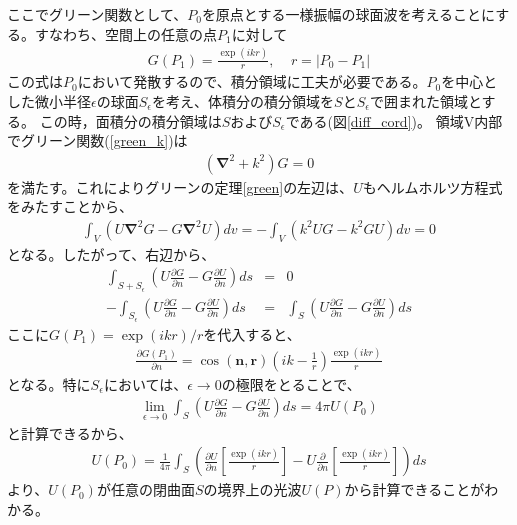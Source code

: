 \documentclass[a4paper,11pt,uplatex]{jsbook}
\begin{document}
ここでグリーン関数として、$P_0$を原点とする一様振幅の球面波を考えることにする。すなわち、空間上の任意の点$P_1$に対して
\begin{eqnarray}
  G(P_1) = \frac{\exp(ikr)}{r},~~~~~r = \left|P_0- P_1\right| \label{green_k}
\end{eqnarray}
この式は$P_0$において発散するので、積分領域に工夫が必要である。$P_0$を中心とした微小半径$\epsilon$の球面$S_\epsilon$を考え、体積分の積分領域を$S$と$S_\epsilon$で囲まれた領域とする。
この時，面積分の積分領域は$S$および$S_\epsilon$である(図\ref{diff_cord})。
領域V内部でグリーン関数(\ref{green_k})は
\begin{eqnarray}
  \left(\bm{\nabla}^2 + k^2\right)G = 0 
\end{eqnarray}
を満たす。これによりグリーンの定理\ref{green}の左辺は、$U$もヘルムホルツ方程式をみたすことから、
\begin{eqnarray}
  \int_V \left(U\bm{\nabla}^2G - G\bm{\nabla}^2U\right) dv =  - \int_V \left( k^2UG - k^2GU\right)dv  = 0
\end{eqnarray}
となる。したがって、右辺から、
\begin{eqnarray}
  \int_{S+S_\epsilon} \left( U\frac{\partial G}{\partial n} - G\frac{\partial U}{\partial n}\right)ds &=& 0\\
  -\int_{S_\epsilon} \left( U\frac{\partial G}{\partial n} - G\frac{\partial U}{\partial n}\right) ds &=& 
  \int_S \left( U\frac{\partial G}{\partial n} - G\frac{\partial U}{\partial n}\right) ds
\end{eqnarray}
ここに$G(P_1) = \exp(ikr)/r$を代入すると、
\begin{eqnarray}
  \frac{\partial G(P_1)}{\partial n} = \cos(\bm{n},\bm{r})\left(ik - \frac{1}{r}\right)\frac{\exp(ikr)}{r}
\end{eqnarray}
となる。特に$S_\epsilon$においては、$\epsilon \rightarrow 0$の極限をとることで、
\begin{eqnarray}
  \lim_{\epsilon \rightarrow 0} \int_S \left( U\frac{\partial G}{\partial n} - G\frac{\partial U}{\partial n}\right)ds
   =4\pi U(P_0)
\end{eqnarray}
と計算できるから、
\begin{eqnarray}
  U(P_0) = \frac{1}{4\pi}\int_S \left( \frac{\partial U}{\partial n} \left[ \frac{\exp(ikr)}{r} \right] - U\frac{\partial}{\partial n} \left[ \frac{\exp(ikr)}{r}\right] \right) ds
\end{eqnarray}
より、$U(P_0)$が任意の閉曲面$S$の境界上の光波$U(P)$から計算できることがわかる。
\end{document}
